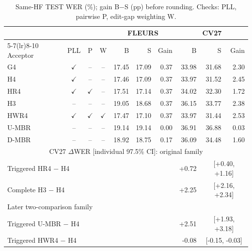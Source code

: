 \begin{table}[!t]\centering\footnotesize
\caption{Same-HF TEST WER (\%); gain B$-$S (pp) before rounding. Checks: PLL, pairwise P, edit-gap weighting W.}\label{tab:hfacceptors}
\setlength{\tabcolsep}{2pt}\renewcommand{\arraystretch}{1.00}
\begin{tabular}{@{}lcccrrrrrr@{}}\toprule
 & & & & \multicolumn{3}{c}{FLEURS} & \multicolumn{3}{c}{CV27}\\
\cmidrule(lr){5-7}\cmidrule(lr){8-10}
Acceptor & PLL & P & W & B & S & Gain & B & S & Gain\\\midrule
G4 & $\checkmark$ & -- & -- & 17.45 & 17.09 & 0.37 & 33.98 & 31.68 & 2.30\\
H4 & $\checkmark$ & -- & -- & 17.46 & 17.09 & 0.37 & 33.97 & 31.52 & 2.45\\
HR4 & $\checkmark$ & $\checkmark$ & -- & 17.51 & 17.14 & 0.37 & 34.02 & 32.30 & 1.72\\
H3 & -- & -- & -- & 19.05 & 18.68 & 0.37 & 36.15 & 33.77 & 2.38\\
HWR4 & $\checkmark$ & $\checkmark$ & $\checkmark$ & 17.47 & 17.10 & 0.37 & 33.97 & 31.44 & 2.53\\
U-MBR & -- & -- & -- & 19.14 & 19.14 & 0.00 & 36.91 & 36.88 & 0.03\\
D-MBR & -- & -- & -- & 18.92 & 18.75 & 0.17 & 36.09 & 34.48 & 1.60\\
\midrule\multicolumn{10}{c}{CV27 $\Delta$WER [individual 97.5\% CI]: original family}\\
\multicolumn{7}{l}{Triggered HR4 $-$ H4} & +0.72 & \multicolumn{2}{c}{[+0.40, +1.16]}\\
\multicolumn{7}{l}{Complete H3 $-$ H4} & +2.25 & \multicolumn{2}{c}{[+2.16, +2.34]}\\
\multicolumn{10}{l}{Later two-comparison family}\\
\multicolumn{7}{l}{Triggered U-MBR $-$ H4} & +2.51 & \multicolumn{2}{c}{[+1.93, +3.18]}\\
\multicolumn{7}{l}{Triggered HWR4 $-$ H4} & -0.08 & \multicolumn{2}{c}{[-0.15, -0.03]}\\
\bottomrule\end{tabular}\end{table}
